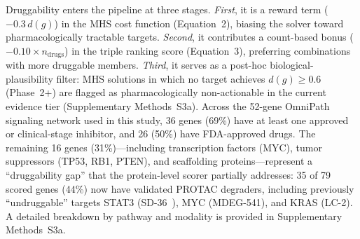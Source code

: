 \documentclass[times, twoside, watermark]{zHenriquesLab-StyleBioRxiv}
\begin{document}
Druggability enters the pipeline at three stages. \emph{First}, it is a reward term ($-0.3\,d(g)$) in the MHS cost function (Equation~2), biasing the solver toward pharmacologically tractable targets. \emph{Second}, it contributes a count-based bonus ($-0.10 \times n_{\text{drugs}}$) in the triple ranking score (Equation~3), preferring combinations with more druggable members. \emph{Third}, it serves as a post-hoc biological-plausibility filter: MHS solutions in which no target achieves $d(g) \geq 0.6$ (Phase~2+) are flagged as pharmacologically non-actionable in the current evidence tier (Supplementary Methods~S3a). Across the 52-gene OmniPath signaling network used in this study, 36 genes (69\%) have at least one approved or clinical-stage inhibitor, and 26 (50\%) have FDA-approved drugs. The remaining 16 genes (31\%)---including transcription factors (MYC), tumor suppressors (TP53, RB1, PTEN), and scaffolding proteins---represent a ``druggability gap'' that the protein-level scorer partially addresses: 35 of 79 scored genes (44\%) now have validated PROTAC degraders, including previously ``undruggable'' targets STAT3 (SD-36~\cite{Bai2019}), MYC (MDEG-541), and KRAS (LC-2). A detailed breakdown by pathway and modality is provided in Supplementary Methods~S3a.
\end{document}
